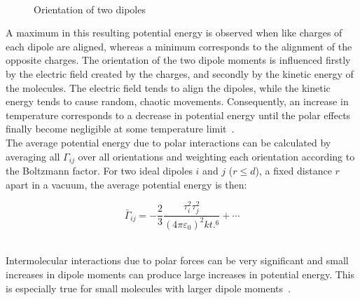 \begin{figure}
\begin{center}
\resizebox{0.8\textwidth}{!}{}\\
\end{center}
\caption{Orientation of two dipoles } \label{DipoleDrawing}
\end{figure}

A maximum in this resulting potential energy is observed when like charges of each dipole are aligned, whereas a minimum corresponds to the alignment of the opposite charges. The orientation of the two dipole moments is influenced firstly by the electric field created by the charges, and secondly by the kinetic energy of the molecules. The electric field tends to align the dipoles, while the kinetic energy tends to cause random, chaotic movements. Consequently, an increase in temperature corresponds to a decrease in potential energy until the polar effects finally become negligible at some temperature limit~\cite{MolecularThermodynamicsOfFluidPhaseEquilibria}.\\

The average potential energy due to polar interactions can be calculated by averaging all $\Gamma_{ij}$ over all orientations and weighting each orientation according to the Boltzmann factor. For two ideal dipoles $i$ and $j$ ($r \le d$), a fixed distance $r$ apart in a vacuum, the average potential energy is then:~\cite{MolecularThermodynamicsOfFluidPhaseEquilibria}\

\begin{equation}
\bar{\Gamma}_{ij} = -\frac{2}{3}\frac{\tau_{i}^{2}\tau_{j}^{2}}{\left(4 \pi \varepsilon_{0}\right)^{2}kt.^{6}}+\cdots \label{Dipole Potential Average}
\end{equation}\


Intermolecular interactions due to polar forces can be very significant and small increases in dipole moments can produce large increases in potential energy. This is especially true for small molecules with larger dipole moments~\cite{MolecularThermodynamicsOfFluidPhaseEquilibria}.\\


